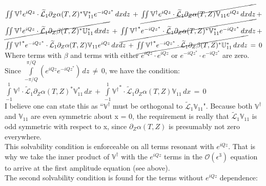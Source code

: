 \documentclass[letterpaper,12pt]{article}
\begin{document}
 $\iint \mathbb{V}^\dagger e^{iQz} \cdot \widetilde{\mathcal{L}}_1 \partial_Z \alpha(T, Z)^* \mathbb{V}_{11}^* e^{-i Q z^*} \, dx dz \, + \, \cancel{\iint \mathbb{V}^\dagger e^{iQz} \cdot \widetilde{\mathcal{L}}_1 \partial_Z \alpha(T, Z) \mathbb{V}_{11} e^{i Q z} \, dx dz} \, + $ \\
$\cancel{\iint \mathbb{V}^\dagger e^{iQz} \cdot \widetilde{\mathcal{L}}_1 \partial_Z \beta(T, Z)^*\mathbb{U}_{11}^* \, dx dz} \, + \, \cancel{\iint {\mathbb{V}^\dagger}^* e^{-iQz^*} \cdot \widetilde{\mathcal{L}}_1 \partial_Z \alpha(T, Z)^* \mathbb{V}_{11}^* e^{-i Q z^*} \, dx dz} \, + $\\
\noindent $\iint {\mathbb{V}^\dagger}^* e^{-iQz^*} \cdot \widetilde{\mathcal{L}}_1 \partial_Z \alpha(T, Z) \mathbb{V}_{11} e^{i Q z} \, dxdz \, + \, \cancel{\iint {\mathbb{V}^\dagger}^* e^{-iQz^*} \cdot \widetilde{\mathcal{L}}_1 \partial_Z \beta(T, Z)^*\mathbb{U}_{11}^* \, dx dz} \, = \, 0$ \\

Where terms with $\beta$ and terms with either $e^{iQz}\cdot e^{iQz}$ or  $e^{-iQz^*}\cdot e^{-iQz^*}$ are zero. Since $\int \limits_{-\pi/Q}^{\pi/Q} \left(e^{iQz}e^{-iQz^*}\right) \, dz \, \ne \, 0$, we have the condition: \\

$\int \limits_{-1}^1 \mathbb{V}^\dagger \cdot \widetilde{\mathcal{L}}_1 \partial_Z \alpha(T, Z)^* \mathbb{V}_{11}^*\, dx \, + \, \int \limits_{-1}^1 {\mathbb{V}^\dagger}^* \cdot \widetilde{\mathcal{L}}_1 \partial_Z \alpha(T, Z) \mathbb{V}_{11} \, dx \, = \, 0$ \\
 
I believe one can state this as ``$\mathbb{V}^\dagger$ must be orthogonal to $\widetilde{\mathcal{L}}_1 \mathbb{V}_{11}$". Because both $\mathbb{V}^\dagger$ and $\mathbb{V}_{11}$ are even symmetric about x = 0, the requirement is really that $\widetilde{\mathcal{L}}_1 \mathbb{V}_{11}$ is odd symmetric with respect to x, since $\partial_Z \alpha(T, Z)$ is presumably not zero everywhere. \\

This solvability condition is enforceable on all terms resonant with $e^{iQz}$. That is why we take the inner product of $\mathbb{V}^\dagger$ with the $e^{iQz}$ terms in the $\mathcal{O}(\epsilon^3)$ equation to arrive at the first amplitude equation (see above). \\

The second solvability condition is found for the terms without $e^{iQz}$ dependence: \\
\end{document}
